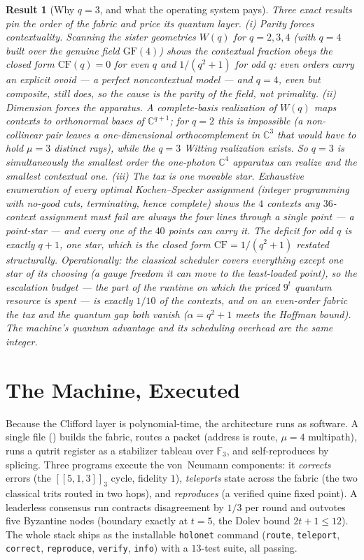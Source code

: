\documentclass[11pt]{article}
\newtheorem{result}{Result}
\begin{document}
\begin{result}[Why $q=3$, and what the operating system pays]
Three exact results pin the order of the fabric and price its quantum layer.
\emph{(i) Parity forces contextuality.}  Scanning the sister geometries $W(q)$ for $q=2,3,4$ (with
$q=4$ built over the genuine field $\mathrm{GF}(4)$) shows the contextual fraction obeys the closed form
$\mathrm{CF}(q)=0$ for even $q$ and $1/(q^2+1)$ for odd $q$: even orders carry an explicit ovoid --- a
perfect noncontextual model --- and $q=4$, even but composite, still does, so the cause is the parity of
the field, not primality.  \emph{(ii) Dimension forces the apparatus.}  A complete-basis realization of
$W(q)$ maps contexts to orthonormal bases of $\mathbb C^{q+1}$; for $q=2$ this is impossible (a
non-collinear pair leaves a one-dimensional orthocomplement in $\mathbb C^3$ that would have to hold
$\mu=3$ distinct rays), while the $q=3$ Witting realization exists.  So $q=3$ is simultaneously the
smallest order the one-photon $\mathbb C^4$ apparatus can realize and the smallest contextual one.
\emph{(iii) The tax is one movable star.}  Exhaustive enumeration of every optimal Kochen--Specker
assignment (integer programming with no-good cuts, terminating, hence complete) shows the $4$ contexts
any $36$-context assignment must fail are always the four lines through a single point --- a
\emph{point-star} --- and every one of the $40$ points can carry it.  The deficit for odd $q$ is exactly
$q+1$, one star, which is the closed form $\mathrm{CF}=1/(q^2+1)$ restated structurally.  Operationally:
the classical scheduler covers everything except one star of its choosing (a gauge freedom it can move to
the least-loaded point), so the escalation budget --- the part of the runtime on which the priced $9^t$
quantum resource is spent --- is exactly $1/10$ of the contexts, and on an even-order fabric the tax and
the quantum gap both vanish ($\alpha=q^2+1$ meets the Hoffman bound).  The machine's quantum advantage
and its scheduling overhead are the same integer.
\end{result}

\section{The Machine, Executed}
Because the Clifford layer is polynomial-time, the architecture runs as software. A single file
() builds the fabric, routes a packet (address is route, $\mu=4$
multipath), runs a qutrit register as a stabilizer tableau over $\mathbb{F}_3$, and self-reproduces by
splicing. Three programs execute the von~Neumann components: it \emph{corrects} errors (the
$[[5,1,3]]_3$ cycle, fidelity $1$), \emph{teleports} state across the fabric (the two classical trits
routed in two hops), and \emph{reproduces} (a verified quine fixed point). A leaderless consensus run
contracts disagreement by $1/3$ per round and outvotes five Byzantine nodes (boundary exactly at $t=5$,
the Dolev bound $2t+1\le12$). The whole stack ships as the installable \texttt{holonet} command
(\texttt{route}, \texttt{teleport}, \texttt{correct}, \texttt{reproduce}, \texttt{verify}, \texttt{info})
with a $13$-test suite, all passing.
\end{document}
